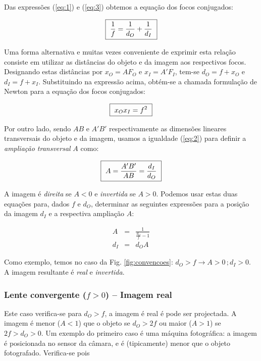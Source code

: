 \documentclass[12pt,a4paper,oneside]{paper}
\begin{document}
Das expressões (\ref{eq:1}) e (\ref{eq:3}) obtemos a equação dos focos conjugados:
 
 \begin{equation}
	\label{eq:focosconjug}
    \fbox{
        $ \displaystyle
	\frac{1}{f} = \frac{1}{d_O} +\frac{1}{d_I} 
        $
    }
\end{equation}

Uma forma alternativa e muitas vezes conveniente de exprimir esta relação consiste em utilizar as distâncias do objeto
e da imagem aos respectivos focos. Designando estas distâncias por $x_O=AF_O$ e $x_I=A'F_I$, tem-se $d_O=f+x_O$ e $d_I=f+x_I$.
Substituindo na expressão acima, obtém-se a chamada formulação de Newton para a equação dos focos conjugados:

 \begin{equation}
	\label{eq:focosconjugnewton}
    \fbox{
        $ \displaystyle
	x_Ox_I = f^2
        $
    }
\end{equation}

Por outro lado, sendo $AB$ e $A'B'$ respectivamente as dimensões lineares transversais do objeto e da imagem, usamos a
igualdade (\ref{eq:2}) para definir a \emph{ampliação transversal} $A$ como:

 \begin{equation}
    \fbox{
        $ \displaystyle
A =  \frac{A'B'}{ AB} =\frac{d_I}{d_O}
$
}
\end{equation}
 
A imagem é \emph{direita} se $A<0$ e \emph{invertida} se $A>0$. Podemos usar estas duas equações para, dados $f$ e $d_O$,
determinar as seguintes expressões para a posição da imagem $d_I$ e a respectiva ampliação $A$:
 
\begin{eqnarray}
A&=&\frac{1}{\frac{d_O}{f}-1}\\
d_I&=&d_OA
\end{eqnarray}

 
Como exemplo, temos no caso da Fig. \ref{fig:convencoes}: $d_O>f \to A> 0\,; d_I > 0$. A imagem resultante é \emph{real}
e \emph{invertida}.

\subsubsection{\sf Lente convergente ($f>0$) -- Imagem real}
Este caso verifica-se para $d_O>f$, a imagem é real é pode ser projectada. A imagem é menor ($A<1$) que o objeto se $d_O>2f$
ou maior ($A>1$) se $2f>d_O>0$. Um exemplo do primeiro caso é uma máquina fotográfica: a imagem é posicionada no sensor da câmara,
e é (tipicamente) menor que o objeto fotografado. Verifica-se   pois
\end{document}
